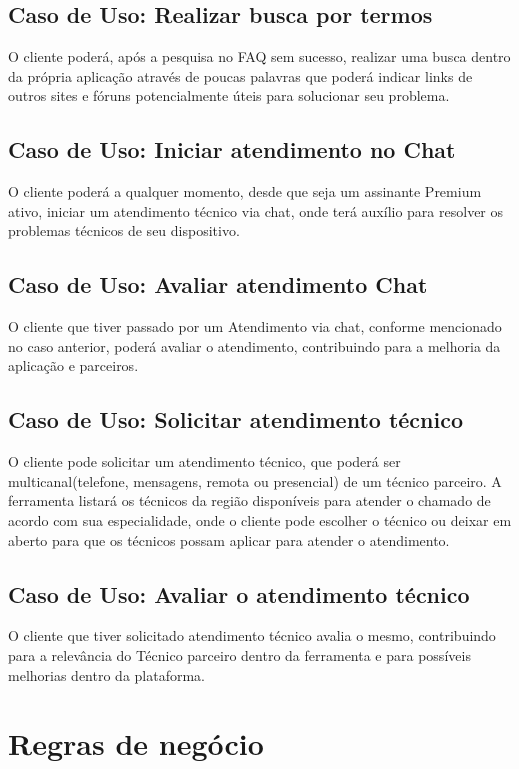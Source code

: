 \documentclass[
    12pt,               %
    openright,          %
    oneside,
    a4paper,            %
    MODELO,             %
    english,            %
    brazil              %
   ]{ifsp-spo-inf-ctds}
\begin{document}
\subsection{Caso de Uso: Realizar busca por termos}
O cliente poderá, após a pesquisa no FAQ sem sucesso, realizar uma busca dentro da própria aplicação através de poucas palavras que poderá indicar links de outros sites e fóruns potencialmente úteis para solucionar seu problema.

\subsection{Caso de Uso: Iniciar atendimento no Chat}
O cliente poderá a qualquer momento, desde que seja um assinante Premium ativo, iniciar um atendimento técnico via chat, onde terá auxílio para resolver os problemas técnicos de seu dispositivo.

\subsection{Caso de Uso: Avaliar atendimento Chat}
O cliente que tiver passado por um Atendimento via chat, conforme mencionado no caso anterior, poderá avaliar o atendimento, contribuindo para a melhoria da aplicação e parceiros.

\subsection{Caso de Uso: Solicitar atendimento técnico}
O cliente pode solicitar um atendimento técnico, que poderá ser multicanal(telefone, mensagens, remota ou presencial) de um técnico parceiro. A ferramenta listará os técnicos da região disponíveis para atender o chamado de acordo com sua especialidade, onde o cliente pode escolher o técnico ou deixar em aberto para que os técnicos possam aplicar para atender o atendimento.

\subsection{Caso de Uso: Avaliar o atendimento técnico}
O cliente que tiver solicitado atendimento técnico avalia o mesmo, contribuindo para a relevância do Técnico parceiro dentro da ferramenta e para possíveis melhorias dentro da plataforma.

\section{Regras de negócio}
\end{document}
